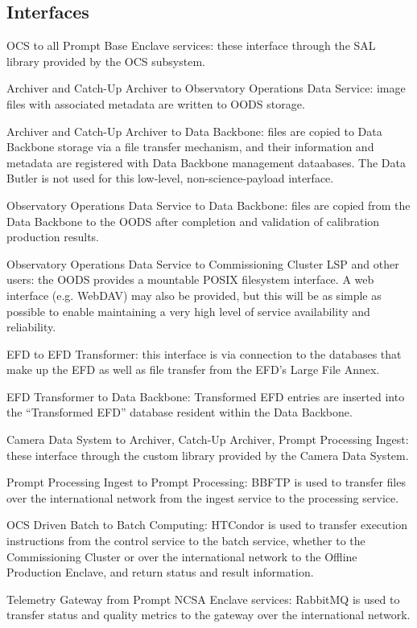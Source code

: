 \documentclass[DM,toc,lsstdraft]{lsstdoc}
\begin{document}
\subsection{Interfaces}\label{base-interfaces}

OCS to all Prompt Base Enclave services: these interface through the SAL
library provided by the OCS subsystem.

Archiver and Catch-Up Archiver to Observatory Operations Data Service:
image files with associated metadata are written to OODS storage.

Archiver and Catch-Up Archiver to Data Backbone: files are copied to
Data Backbone storage via a file transfer mechanism, and their
information and metadata are registered with Data Backbone management
dataabases. The Data Butler is not used for this low-level,
non-science-payload interface.

Observatory Operations Data Service to Data Backbone: files are copied from the Data Backbone to the OODS after completion and validation of calibration production results.

Observatory Operations Data Service to Commissioning Cluster LSP and other users: the OODS provides a mountable POSIX filesystem interface.
A web interface (e.g. WebDAV) may also be provided, but this will be as simple as possible to enable maintaining a very high level of service availability and reliability.

EFD to EFD Transformer: this interface is via connection to the
databases that make up the EFD as well as file transfer from the EFD's
Large File Annex.

EFD Transformer to Data Backbone: Transformed EFD entries are inserted
into the ``Transformed EFD'' database resident within the Data Backbone.

Camera Data System to Archiver, Catch-Up Archiver, Prompt Processing
Ingest: these interface through the custom library provided by the
Camera Data System.

Prompt Processing Ingest to Prompt Processing: BBFTP is used to transfer
files over the international network from the ingest service to the
processing service.

OCS Driven Batch to Batch Computing: HTCondor is
used to transfer execution instructions
from the control service to the batch service, whether to the Commissioning Cluster or over the international network to the Offline Production Enclave, and return status and
result information.

Telemetry Gateway from Prompt NCSA Enclave services: RabbitMQ is
used to transfer status and quality metrics to the gateway over the
international network.
\end{document}
